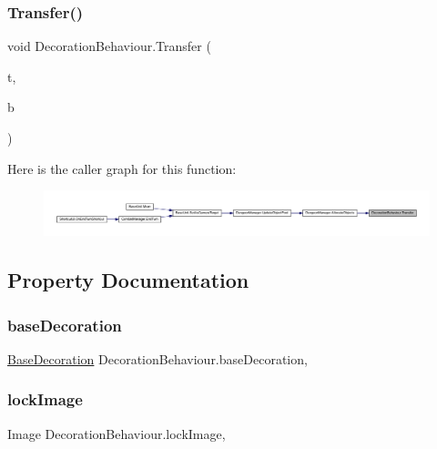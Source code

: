 \subsubsection{\texorpdfstring{Transfer()}{Transfer()}}
{\footnotesize\ttfamily void Decoration\+Behaviour.\+Transfer (\begin{DoxyParamCaption}\item[{\mbox{\hyperlink{class_tile}{Tile}}}]{t,  }\item[{\mbox{\hyperlink{class_base_decoration}{Base\+Decoration}}}]{b }\end{DoxyParamCaption})}

Here is the caller graph for this function\+:
\nopagebreak
\begin{figure}[H]
\begin{center}
\leavevmode
\includegraphics[width=350pt]{class_decoration_behaviour_a6f5bef52b05859295759318878ec9a1c_icgraph}
\end{center}
\end{figure}


\subsection{Property Documentation}
\mbox{\label{class_decoration_behaviour_a2d21a94b61e9200465d4508e0913e51d}} 
\subsubsection{\texorpdfstring{baseDecoration}{baseDecoration}}
{\footnotesize\ttfamily \mbox{\hyperlink{class_base_decoration}{Base\+Decoration}} Decoration\+Behaviour.\+base\+Decoration\hspace{0.3cm}{\ttfamily [get]}, {\ttfamily [set]}}

\mbox{\label{class_decoration_behaviour_afdf4d387bacdf9075944663410c189f0}} 
\subsubsection{\texorpdfstring{lockImage}{lockImage}}
{\footnotesize\ttfamily Image Decoration\+Behaviour.\+lock\+Image\hspace{0.3cm}{\ttfamily [get]}, {\ttfamily [set]}}

